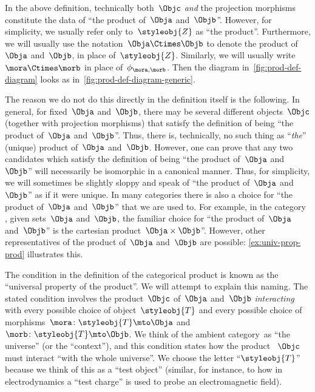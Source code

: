 \begin{marginfigure}
    \centering
    \caption{}
    \label{fig:prod-def-diagram-generic}
\end{marginfigure}

\begin{remark}
    \label{prod unique up to iso}
    In the above definition, technically both~$\Objc$ \emph{and} the projection morphisms constitute the data of ``the product of~$\Obja$ and~$\Objb$''.
    However, for simplicity, we usually refer only to~$\styleobj{Z}$ as ``the product''.
    Furthermore, we will usually use the notation~$\Obja \Ctimes \Objb$ to denote the product of~$\Obja$ and~$\Objb$, in place of~$\styleobj{Z}$.
    Similarly, we will usually write~$\mora \Ctimes \morb$ in place of~$\phi_{\mora, \morb}$. Then the diagram in~\cref{fig:prod-def-diagram} looks as in~\cref{fig:prod-def-diagram-generic}.

    The reason we do not do this directly in the definition itself is the following.
    In general, for fixed~$\Obja$ and~$\Objb$, there may be several different objects~$\Objc$ (together with projection morphisms) that satisfy the definition of being ``the product of~$\Obja$ and~$\Objb$''.
    Thus, there is, technically, no such thing as ``\emph{the}'' (unique) product of~$\Obja$ and~$\Objb$.
    However, one can prove that any two candidates which satisfy the definition of being ``the product of~$\Obja$ and~$\Objb$'' will necessarily be isomorphic in a canonical manner.
    Thus, for simplicity, we will sometimes be slightly sloppy and speak of ``the product of~$\Obja$ and~$\Objb$'' as if it were unique.
    In many categories there is also a choice for ``the product of~$\Obja$ and~$\Objb$'' that we are used to.
    For example, in the category \Set, given sets~$\Obja$ and~$\Objb$, the familiar choice for ``the product of~$\Obja$ and~$\Objb$'' is the cartesian product~$\Obja \times \Objb$''.
    However, other representatives of the product of~$\Obja$ and~$\Objb$ are possible: \cref{ex:univ-prop-prod} illustrates this.
\end{remark}

\begin{remark}
    The condition in the definition of the categorical product is known as the ``universal property of the product''.
    We will attempt to explain this naming.
    The stated condition involves the product~$\Objc$ of~$\Obja$ and~$\Objb$ \emph{interacting} with every possible choice of object~$\styleobj{T}$ and every possible choice of morphisms~$\mora \colon \styleobj{T} \mto \Obja$ and~$\morb\colon \styleobj{T} \mto \Objb$.
    We think of the ambient category~\CatC as ``the universe'' (or the ``context''), and this condition states how the product ~$\Objc$ must interact ``with the whole universe''.
    We choose the letter ``$\styleobj{T}$'' because we think of this as a ``test object'' (similar, for instance,  to how in electrodynamics a ``test charge'' is used to probe an electromagnetic field).
\end{remark}

